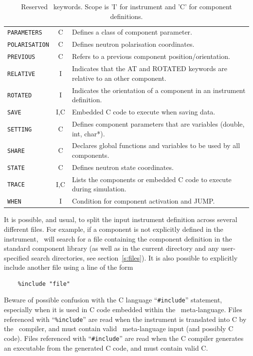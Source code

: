 \begin{table}
\begin{center}
{\begin{tabular}{|l|c|p{}|}
      \texttt{PARAMETERS} & C & Defines a class of component parameter. \\
      \texttt{POLARISATION} & C & Defines neutron polarisation coordinates. \\
      \texttt{PREVIOUS} & C & Refers to a previous component position/orientation.\\
      \texttt{RELATIVE} & I & Indicates that the AT and ROTATED keywords are relative to an other component. \\
      \texttt{ROTATED} & I & Indicates the orientation of a component in an instrument definition. \\
      \texttt{SAVE} & I,C & Embedded C code to execute when saving data. \\
      \texttt{SETTING} & C & Defines component parameters that are
      variables (double, int, char*). \\
      \texttt{SHARE} & C & Declares global functions and variables to be used by all components. \\
      \texttt{STATE} & C & Defines neutron state coordinates. \\
      \texttt{TRACE} & I,C & Lists the components or embedded C code to execute during simulation. \\
      \texttt{WHEN}  & I & Condition for component activation and JUMP.\\
      \hline
    \end{tabular}
    \caption{Reserved \MCS\ keywords.
    Scope is 'I' for instrument and 'C' for component definitions.}
    \label{t:keywords}
    }
  \end{center}
\end{table}

It is possible, and usual, to split the input instrument definition
across several different files. For example, if a component is not
explicitly defined in the instrument,
\MCS\ will search for a file containing the component definition in the
standard component library (as well as in the current directory and any
user-specified search directories, see section~\ref{s:files}). It is
also possible to explicitly include another file using a line of the
form 
\begin{verbatim}
    %include "file"
\end{verbatim}
Beware of possible confusion with the C language ``\verb+#include+''
statement, especially when it is used in C code embedded within the
\MCS\ meta-language. Files referenced with ``\verb+%include+'' are read
when the instrument is translated into C by the \MCS\ compiler, and must
contain valid \MCS\ meta-language input (and possibly C code). Files referenced with
``\verb+#include+'' are read when the C compiler generates an
executable from the generated C code, and must contain valid C.


